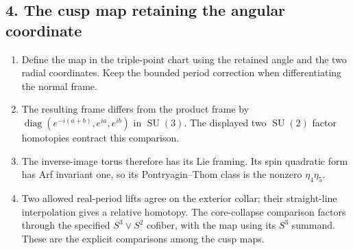\subsection*{4. The cusp map retaining the angular coordinate}
\RungOne
\begin{enumerate}[label=\arabic*.,leftmargin=*]
\item Define the map in the triple-point chart using the retained
angle and the two radial coordinates.  Keep the bounded period
correction when differentiating the normal frame.
\item The resulting frame differs from the product frame by
$\operatorname{diag}(e^{-i(a+b)},e^{ia},e^{ib})$ in
$\operatorname{SU}(3)$.  The displayed two $\operatorname{SU}(2)$
factor homotopies contract this comparison.
\item The inverse-image torus therefore has its Lie framing.  Its
spin quadratic form has Arf invariant one, so its Pontryagin--Thom
class is the nonzero $\eta_4\eta_5$.
\item Two allowed real-period lifts agree on the exterior collar;
their straight-line interpolation gives a relative homotopy.
The core-collapse comparison factors through the specified
$S^3\vee S^2$ cofiber, with the map using its $S^3$ summand.
These are the explicit comparisons among the cusp maps.
\end{enumerate}

